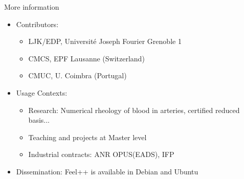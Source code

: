 \documentclass[final,utf8,,hyperref={pdfpagelabels=false}]{beamer}
\begin{document}
\begin{frame}[containsverbatim]{}
\begin{columns}[t]
      \begin{block}{More information}
        \vspace{-0.5cm}
      \begin{itemize}
      \item Contributors:
        \begin{itemize}
        \item LJK/EDP, Université Joseph Fourier Grenoble 1
        \item CMCS, EPF Lausanne (Switzerland)
        \item CMUC, U. Coimbra (Portugal)
        \end{itemize}
      \item Usage Contexts:
        \begin{itemize}
        \item Research: Numerical rheology of blood in arteries, certified
          reduced basis...
        \item Teaching and projects at Master level
        \item Industrial contracts: ANR OPUS(EADS), IFP
        \end{itemize}
      \item Dissemination: Feel++ is available in Debian and Ubuntu
      \end{itemize}
    \end{block}

  \end{columns}
  \end{frame}





  
\end{document}
